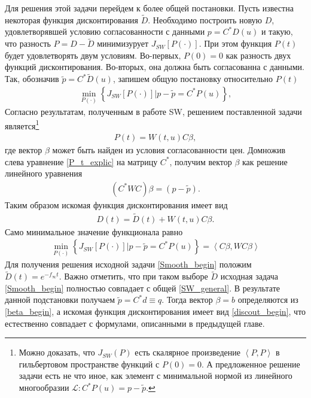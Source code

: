 \documentclass[10pt]{article}
\theoremstyle{definition}
\theoremstyle{remark}
\theoremstyle{plain}
\newcommand{\wt}{\widetilde}
\newcommand{\w}{f_\infty}
\newcommand{\scalar}[2]{\left<#1,#2\right>}
\begin{document}
Для решения этой задачи перейдем к более общей постановки. Пусть известна некоторая функция дисконтирования $\wt{D}$. Необходимо построить новую $D$, удовлетворявшей условию согласованности с данными $p = C^*D(u)$ и такую, что разность $P = D-\wt{D}$ минимизурует $J_{SW}[P(\cdot)].$ 
При этом функция $P(t)$ будет удовлетворять двум условиям. Во-первых, $P(0) = 0$ как разность двух функций дисконтирования. Во-вторых, она должна быть согласованна с данными. Так, обозначив $\tilde{p} = C^*\wt{D}(u)$, запишем общую постановку относительно $P(t)$
\begin{align}
\min\limits_{P(\cdot)}
\left\{
	J_{SW}\left[P(\cdot)\right]
	\Big|
	p - \tilde{p} = C^*P(u)
\right\}, \label{SW_general}
\end{align}
Согласно результатам, полученным в работе SW, решением поставленной задачи является\footnote{
Можно доказать, что $J_{SW}(P)$ есть скалярное произведение $\scalar{P}{P}$ в гильбертовом пространстве функций с $P(0) = 0$. А предложенное решение задачи есть не что иное, как элемент с минимальной нормой из линейного многообразии $\mathcal{L}:C^*P(u) = p-\tilde{p}.$
}
\begin{align}
P(t) = W(t,u)C\beta, \label{P_t_explic}
\end{align}
где вектор $\beta$ может быть найден из условия согласованности цен. Домножив слева уравнение \eqref{P_t_explic} на матрицу $C^*$, получим вектор $\beta$ как решение линейного уравнения
\begin{align}
(C^*WC)\beta = (p-\tilde{p}). \label{beta_begin}
\end{align}
Таким образом искомая функция дисконтирования имеет вид
\begin{align}
D(t) = \wt{D}(t) + W(t,u)C\beta. \label{discout_begin}
\end{align}
Само минимальное значение функционала равно 
\begin{align*}
\min\limits_{P(\cdot)}
\left\{
	J_{SW}[P(\cdot)]
	\Big|
	p - \tilde{p} = C^*P(u)
\right\}
= \scalar{C\beta}{WC\beta}
\end{align*}
Для получения решения исходной задачи \eqref{Smooth_begin} положим $\wt{D}(t) = e^{-\w t}$. Важно отметить, что при таком выборе $\wt{D}$ исходная задача \eqref{Smooth_begin} полностью совпадает с общей \eqref{SW_general}. В результате данной подстановки получаем $\tilde{p} = C^*d \equiv q$. Тогда вектор $\beta = b$ определяются из \eqref{beta_begin}, а искомая функция дисконтирования имеет вид \eqref{discout_begin}, что естественно совпадает с   формулами, описанными в предыдущей главе.
\end{document}
